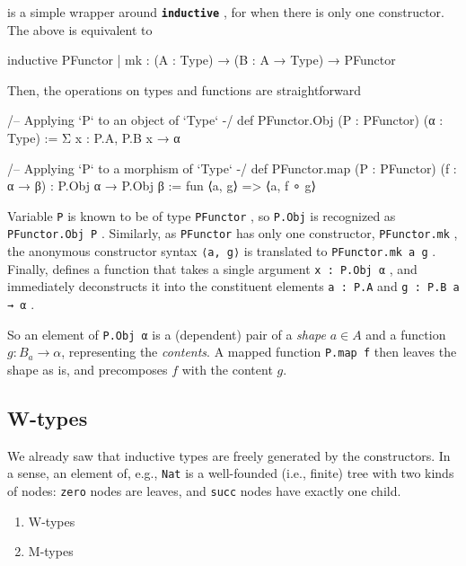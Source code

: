 \documentclass[titlepage]{report}
\newenvironment{remark}{%
\begin{framed}
\begin{trivlist}
    \item[\hskip \labelsep {\bfseries Remark:}]}%
{%
\end{trivlist}%
\end{framed}
}
\newenvironment{todo}{%
\definecolor{shadecolor}{HTML}{F8E0E0}%
\begin{shaded}%
\begin{trivlist}                         
    \item[\hskip \labelsep {\bfseries Todo:}]}{\end{trivlist}\end{shaded}}
\newcommand\lean[1]{{%
\def\leanmode{1}%
\small \texttt{#1}%
\undef\leanmode%
}}
\newcommand\keyword[1]{{\color{keywordcolor} \textbf{\lean{#1}}}}
\newcommand\inductive{{\keyword{inductive}}}
\begin{document}
\begin{remark}
     is a simple wrapper around \inductive, for when there is only one constructor.
    The above is equivalent to
    \begin{leancode}
        inductive PFunctor 
        | mk : (A : Type) → (B : A → Type) → PFunctor
    \end{leancode}
\end{remark}

Then, the operations on types and functions are straightforward
\begin{leancode}
    /-- Applying `P` to an object of `Type` -/
    def PFunctor.Obj (P : PFunctor) (α : Type)
        := Σ x : P.A, P.B x → α

    /-- Applying `P` to a morphism of `Type` -/
    def PFunctor.map (P : PFunctor) (f : α → β) : P.Obj α → P.Obj β 
        := fun ⟨a, g⟩ => ⟨a, f ∘ g⟩
\end{leancode}

\begin{remark}
    Variable \lean{P} is known to be of type \lean{PFunctor}, so \lean{P.Obj} is recognized as \lean{PFunctor.Obj P}. Similarly, as \lean{PFunctor} has only one constructor, \lean{PFunctor.mk}, the anonymous constructor syntax \lean{⟨a, g⟩} is translated to \lean{PFunctor.mk a g}.
    Finally,  defines a function that takes a single argument \lean{x : P.Obj α}, and immediately deconstructs it into the constituent elements \lean{a : P.A} and \lean{g : P.B a → α}.
\end{remark}

So an element of \lean{P.Obj α} is a (dependent) pair of a \emph{shape} $a ∈ A$ and a function $g : B_a \rightarrow \alpha$, representing the \emph{contents}. A mapped function \lean{P.map f} then leaves the shape as is, and precomposes $f$ with the content $g$.

\subsection*{W-types}
We already saw that inductive types are freely generated by the constructors. In a sense, an element of, e.g., \lean{Nat} is a well-founded (i.e., finite) tree with two kinds of nodes: \lean{zero} nodes are leaves, and \lean{succ} nodes have exactly one child.

\begin{todo}
    \begin{enumerate}
        \item W-types
        \item M-types
    \end{enumerate}
\end{todo}
\end{document}

